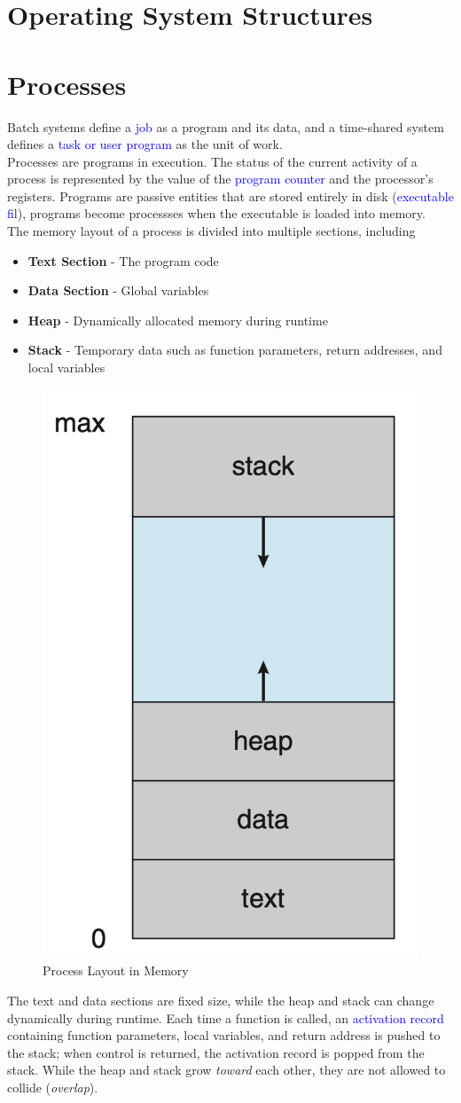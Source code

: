 \documentclass[oneside]{book}
\begin{document}
    \chapter{Operating System Structures}
    \chapter{Processes}
        Batch systems define a \textcolor{blue}{job} as a program and its data, and a time-shared system defines a \textcolor{blue}{task or user program}
        as the unit of work.\\
        Processes are programs in execution. The status of the current activity of a process is represented by the value of 
        the \textcolor{blue}{program counter} and the processor's registers. Programs are passive entities that are stored entirely in
        disk (\textcolor{blue}{executable fil}), programs become processses when the executable is loaded into memory.\\
        The memory layout of a process is divided into multiple sections, including
        \begin{itemize}
            \item \textbf{Text Section} - The program code
            \item \textbf{Data Section} - Global variables
            \item \textbf{Heap} - Dynamically allocated memory during runtime
            \item \textbf{Stack} - Temporary data such as function parameters, return addresses, and local variables
        \end{itemize}
        \begin{figure}[H]
            \centering
            \includegraphics[width=0.2\linewidth]{figures/process_layout.png}
            \caption{Process Layout in Memory}
        \end{figure}
        The text and data sections are fixed size, while the heap and stack can change dynamically during runtime.
        Each time a function is called, an \textcolor{blue}{activation record} containing function parameters, local variables,
        and return address is pushed to the stack; when control is returned, the activation record is popped from the stack.
        While the heap and stack grow \textit{toward} each other, they are not allowed to collide (\textit{overlap}).\\
\end{document}
